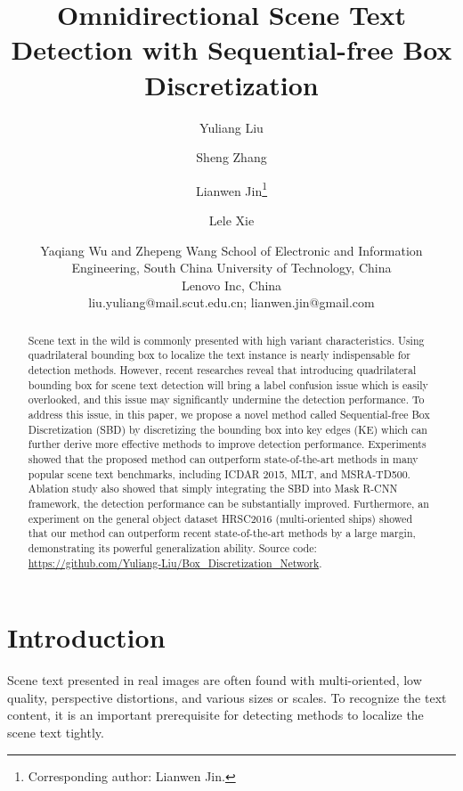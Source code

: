\documentclass{article}
\title{Omnidirectional Scene Text Detection with Sequential-free Box Discretization}
\author{
Yuliang Liu\and
Sheng Zhang\and
Lianwen Jin\footnote{Corresponding author: Lianwen Jin.}\and
Lele Xie\and
Yaqiang Wu \textnormal{and} Zhepeng Wang
\affiliations
School of Electronic and Information Engineering, South China University of Technology, China \\
Lenovo Inc, China\\
\emails
liu.yuliang@mail.scut.edu.cn; lianwen.jin@gmail.com
}
\begin{document}
\maketitle

\begin{abstract}
Scene text in the wild is commonly presented with high variant characteristics. Using quadrilateral bounding box to localize the text instance is nearly indispensable for detection methods. However, recent researches reveal that introducing quadrilateral bounding box for scene text detection will bring a label confusion issue which is easily overlooked, and this issue may significantly undermine the detection performance. 
To address this issue, in this paper, we propose a novel method called Sequential-free Box Discretization (SBD) by discretizing the bounding box into key edges (KE) which can further derive more effective methods to improve detection performance. 
Experiments showed that the proposed method can outperform state-of-the-art methods in many popular scene text benchmarks, including ICDAR 2015, MLT, and MSRA-TD500. Ablation study also showed that simply integrating the SBD into Mask R-CNN framework, the detection performance can be substantially improved.
Furthermore, an experiment on the general object dataset HRSC2016 (multi-oriented ships) showed that our method can outperform recent state-of-the-art methods by a large margin, demonstrating its powerful generalization ability. Source code: {\color{blue} \url{https://github.com/Yuliang-Liu/Box\_Discretization\_Network}}.

\end{abstract}

\section{Introduction}\label{sec:intro}
 Scene text presented in real images are often found with multi-oriented, low quality, perspective distortions, and various sizes or scales. To recognize the text content, it is an important prerequisite for detecting methods to localize the scene text tightly.
\end{document}
